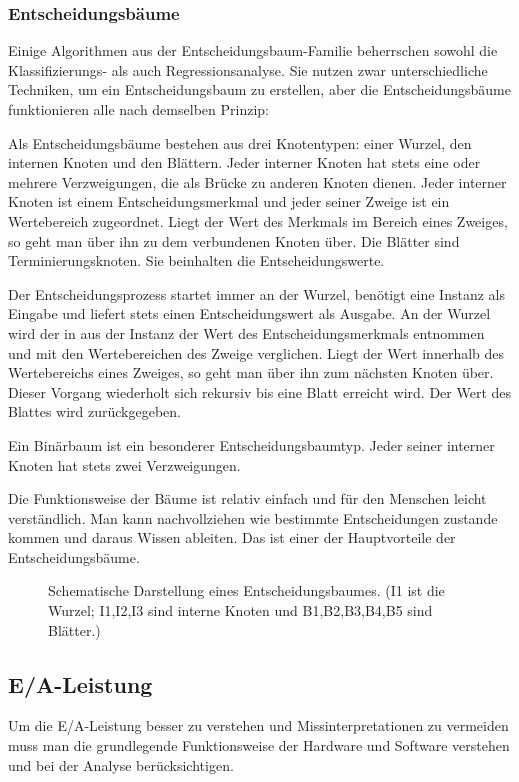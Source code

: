 \subsubsection{Entscheidungsbäume}
Einige Algorithmen aus der Entscheidungsbaum-Familie beherrschen sowohl die Klassifizierungs- als auch Regressionsanalyse. 
Sie nutzen zwar unterschiedliche Techniken, um ein Entscheidungsbaum zu erstellen, aber die Entscheidungsbäume funktionieren alle nach demselben Prinzip: 

Als Entscheidungsbäume bestehen aus drei Knotentypen: einer Wurzel, den internen Knoten und den Blättern. 
Jeder interner Knoten hat stets eine oder mehrere Verzweigungen, die als Brücke zu anderen Knoten dienen. 
Jeder interner Knoten ist einem Entscheidungsmerkmal und jeder seiner Zweige ist ein Wertebereich zugeordnet. 
Liegt der Wert des Merkmals im Bereich eines Zweiges, so geht man über ihn zu dem verbundenen Knoten über. 
Die Blätter sind Terminierungsknoten. 
Sie beinhalten die Entscheidungswerte. 

Der Entscheidungsprozess startet immer an der Wurzel, benötigt eine Instanz als Eingabe und liefert stets einen Entscheidungswert als Ausgabe. 
An der Wurzel wird der in aus der Instanz der Wert des Entscheidungsmerkmals entnommen und mit den Wertebereichen des Zweige verglichen. 
Liegt der Wert innerhalb des Wertebereichs eines Zweiges, so geht man über ihn zum nächsten Knoten über. 
Dieser Vorgang wiederholt sich rekursiv bis eine Blatt erreicht wird. Der Wert des Blattes wird zurückgegeben. 

Ein Binärbaum ist ein besonderer Entscheidungsbaumtyp. 
Jeder seiner interner Knoten hat stets zwei Verzweigungen. 

Die Funktionsweise der Bäume ist relativ einfach und für den Menschen leicht verständlich. 
Man kann nachvollziehen wie bestimmte Entscheidungen zustande kommen und daraus Wissen ableiten. 
Das ist einer der Hauptvorteile der Entscheidungsbäume.


\begin{figure}[h]
	\centering
	
	\label{fig:bas:decision_tree}
	\caption{Schematische Darstellung eines Entscheidungsbaumes. (I1 ist die Wurzel; I1,I2,I3 sind interne Knoten und B1,B2,B3,B4,B5 sind Blätter.)}
\end{figure}


\subsection{E/A-Leistung}
Um die E/A-Leistung besser zu verstehen und Missinterpretationen zu vermeiden muss man die grundlegende Funktionsweise der Hardware und Software verstehen und bei der Analyse berücksichtigen. 

